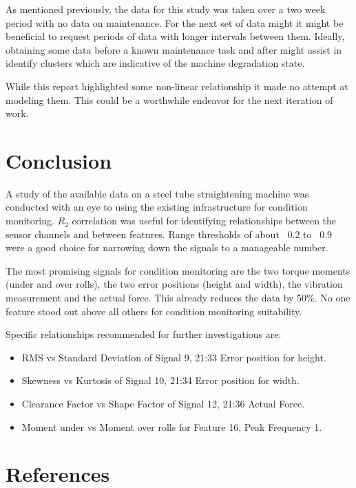 \documentclass[]{article}
\begin{document}
As mentioned previously, the data for this study was taken over a two week period with no data on maintenance. For the next set of data might it might be beneficial to request periods of data with longer intervals between them. Ideally, obtaining some data before a known maintenance task and after might assist in identify clusters which are indicative of the machine degradation state.

While this report highlighted some non-linear relationship it made no attempt at modeling them. This could be a worthwhile endeavor for the next iteration of work.
\clearpage

\section{Conclusion}
A study of the available data on a steel tube straightening machine was conducted with an eye to using the existing infrastructure for condition monitoring. $R_2$ correlation was useful for identifying relationships between the sensor channels and between features. Range thresholds of about ~0.2 to ~0.9 were a good choice for narrowing down the signals to a manageable number.

The most promising signals for condition monitoring are the two torque moments (under and over rolls), the two error positions (height and width), the vibration measurement and the actual force. This already reduces the data by 50\%. No one feature stood out above all others for condition monitoring suitability.

Specific relationships recommended for further investigations are:
\begin{itemize}
\item \gls{RMS} vs Standard Deviation of Signal 9, 21:33 Error position for height.
\item Skewness vs Kurtosis of Signal 10, 21:34 Error position for width.
\item Clearance Factor vs Shape Factor of Signal 12, 21:36 Actual Force.
\item Moment under vs Moment over rolls for Feature 16, Peak Frequency 1.
\end{itemize}
\newpage

\section{References} 
\printbibliography[heading=none] 
\clearpage  
\end{document}
